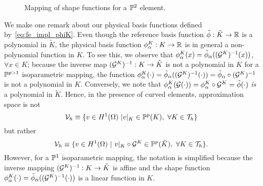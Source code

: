\begin{figure}
  \centering
  \caption{Mapping of shape functions for a $\mathbb{P}^2$ element.}
  \label{fig:fe_impl_shape_map_p2}
\end{figure}

We make one remark about our physical basis functions defined by~\eqref{eq:fe_impl_phiK}.  Even though the reference basis function $\tilde \phi: \tilde K \to \mathbb{R}$ is a polynomial in $\tilde K$, the physical basis function $\phi^K_\alpha: K \to \mathbb{R}$ is in general a non-polynomial function in $K$. To see this, we observe that $\phi^K_\alpha(x) = \tilde \phi_\alpha((\mathcal{G}^K)^{-1}(x))$, $\forall x \in K$; because the inverse map $(\mathcal{G}^K)^{-1}: K \to \tilde K$ is not a polynomial in $K$ for a $\mathbb{P}^{p>1}$ isoparametric mapping, the function $\phi^K_\alpha(\cdot) = \tilde \phi_\alpha((\mathcal{G}^K)^{-1}(\cdot)) = \tilde \phi_\alpha \circ (\mathcal{G}^K)^{-1}$ is not a polynomial in $K$.  Conversely, we note that $\phi^K_\alpha(\mathcal{G}(\cdot)) = \phi^K_\alpha \circ \mathcal{G}^K = \tilde \phi(\cdot)$ \emph{is} a polynomial in $\tilde K$. Hence, in the presence of curved elements, approximation space is not
\begin{equation*}
  \mathcal{V}_h \equiv \{ v \in H^1(\Omega) \ | v|_K \in \mathbb{P}^p(K), \ \forall K \in \mathcal{T}_h \}
\end{equation*}
but rather
\begin{equation*}
  \mathcal{V}_h \equiv \{ v \in H^1(\Omega) \ | \ v|_K \circ \mathcal{G}^K \in \mathbb{P}^p(\tilde K), \ \forall K \in \mathcal{T}_h \}.
\end{equation*}
However, for a $\mathbb{P}^1$ isoparametric mapping, the notation is simplified because the inverse mapping $(\mathcal{G}^K)^{-1}: K \to \tilde K$ is affine and the shape function $\phi^K_\alpha(\cdot) = \tilde \phi_\alpha((\mathcal{G}^K)^{-1}(\cdot))$ is a linear function in $K$.



